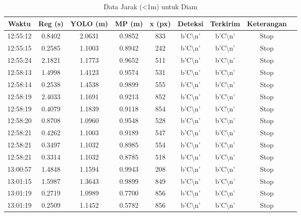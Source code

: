 \begin{table}[H]
    \centering
    \caption{Data Jarak (\textless 1m) untuk Diam}
    \label{tab:jarak_diam}
    \begin{tabular}{|c|c|c|c|c|c|c|c|c|}
    \hline
    Waktu & Reg (s) & YOLO (m) & MP (m) & x (px) & Deteksi & Terkirim & Keterangan \\ \hline
    12:55:12 & 0.8402 & 2.0631 & 0.9852 & 833 & b'C\textbackslash n' & b'C\textbackslash n' & Stop \\ \hline
    12:55:15 & 0.2585 & 1.1003 & 0.8942 & 242 & b'C\textbackslash n' & b'C\textbackslash n' & Stop \\ \hline
    12:55:24 & 2.1821 & 1.1773 & 0.9652 & 511 & b'C\textbackslash n' & b'C\textbackslash n' & Stop \\ \hline
    12:58:13 & 1.4998 & 1.4123 & 0.9574 & 531 & b'C\textbackslash n' & b'C\textbackslash n' & Stop \\ \hline
    12:58:14 & 0.2538 & 1.4538 & 0.9899 & 555 & b'C\textbackslash n' & b'C\textbackslash n' & Stop \\ \hline
    12:58:19 & 2.4033 & 1.1691 & 0.9213 & 852 & b'C\textbackslash n' & b'C\textbackslash n' & Stop \\ \hline
    12:58:19 & 0.4079 & 1.1839 & 0.9118 & 854 & b'C\textbackslash n' & b'C\textbackslash n' & Stop \\ \hline
    12:58:20 & 0.8708 & 1.0960 & 0.9548 & 528 & b'C\textbackslash n' & b'C\textbackslash n' & Stop \\ \hline
    12:58:21 & 0.4262 & 1.1003 & 0.9189 & 547 & b'C\textbackslash n' & b'C\textbackslash n' & Stop \\ \hline
    12:58:21 & 0.3497 & 1.1032 & 0.8985 & 554 & b'C\textbackslash n' & b'C\textbackslash n' & Stop \\ \hline
    12:58:21 & 0.3314 & 1.1032 & 0.8785 & 518 & b'C\textbackslash n' & b'C\textbackslash n' & Stop \\ \hline
    13:00:57 & 1.4848 & 1.1594 & 0.9943 & 208 & b'C\textbackslash n' & b'C\textbackslash n' & Stop \\ \hline
    13:01:15 & 1.5987 & 1.3643 & 0.9899 & 849 & b'C\textbackslash n' & b'C\textbackslash n' & Stop \\ \hline
    13:01:19 & 0.2719 & 1.0989 & 0.7700 & 856 & b'C\textbackslash n' & b'C\textbackslash n' & Stop \\ \hline
    13:01:19 & 0.2509 & 1.1452 & 0.5782 & 856 & b'C\textbackslash n' & b'C\textbackslash n' & Stop \\ \hline

\end{tabular}
\end{table}
